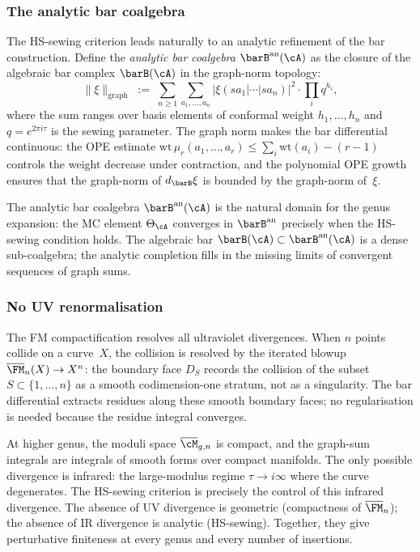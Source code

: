 \subsubsection*{The analytic bar coalgebra}

The HS-sewing criterion leads naturally to an analytic refinement
of the bar construction. Define the \emph{analytic bar coalgebra}
$\barB^{\mathrm{an}}(\cA)$ as the closure of the algebraic bar
complex $\barB(\cA)$ in the graph-norm topology:
\[
\|\xi\|_{\mathrm{graph}}
\;:=\;
\sum_{n\ge 1}\sum_{a_1,\dots,a_n}
|\xi(sa_1|\cdots|sa_n)|^2\cdot
\prod_i q^{h_i},
\]
where the sum ranges over basis elements of conformal weight
$h_1,\dots,h_n$ and $q=e^{2\pi i\tau}$ is the sewing parameter.
The graph norm makes the bar differential continuous: the OPE
estimate $\mathrm{wt}\,\mu_r(a_1,\dots,a_r)\le
\sum_i\mathrm{wt}(a_i)-(r-1)$ controls the weight decrease under
contraction, and the polynomial OPE growth ensures that the
graph-norm of $d_{\barB}\xi$ is bounded by the graph-norm
of~$\xi$.

The analytic bar coalgebra $\barB^{\mathrm{an}}(\cA)$ is the
natural domain for the genus expansion: the MC element
$\Theta_\cA$ converges in $\barB^{\mathrm{an}}$ precisely when
the HS-sewing condition holds. The algebraic bar
$\barB(\cA)\subset\barB^{\mathrm{an}}(\cA)$ is a dense
sub-coalgebra; the analytic completion fills in the missing
limits of convergent sequences of graph sums.

\subsubsection*{No UV renormalisation}

The FM compactification resolves all ultraviolet divergences.
When $n$ points collide on a curve~$X$, the
collision is resolved by the iterated blowup
$\overline{\FM}_n(X)\to X^n$: the boundary face $D_S$ records
the collision of the subset $S\subset\{1,\dots,n\}$ as a
smooth codimension-one stratum, not as a singularity. The
bar differential extracts residues along these smooth boundary
faces; no regularisation is needed because the residue integral
converges.

At higher genus, the moduli space $\overline{\cM}_{g,n}$ is
compact, and the graph-sum integrals are integrals of smooth
forms over compact manifolds. The only possible divergence is
infrared: the large-modulus regime $\tau\to i\infty$ where
the curve degenerates. The HS-sewing criterion is precisely the
control of this infrared divergence. The absence of UV
divergence is geometric (compactness of $\overline{\FM}_n$); the
absence of IR divergence is analytic (HS-sewing). Together, they
give perturbative finiteness at every genus and every number of
insertions.



